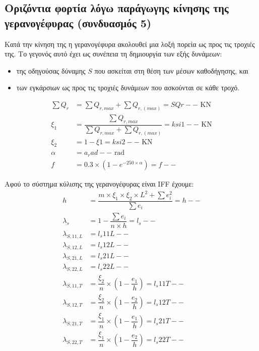 
\subsection{Οριζόντια φορτία λόγω παράγωγης κίνησης της γερανογέφυρας (συνδυασμός 5)}
Κατά την κίνηση της η γερανογέφυρα ακολουθεί μια λοξή πορεία ως προς τις τροχιές της. Το γεγονός αυτό έχει ως συνέπεια τη δημιουργία των εξής δυνάμεων:
\begin{itemize} 
\item της οδηγούσας δύναμης $S$ που ασκείται στη θέση των μέσων καθοδήγησης, και
\item των εγκάρσιων ως προς τις τροχιές δυνάμεων που ασκούνται σε κάθε τροχό.
\end{itemize}

\begin{align*}
\sum{Q_r} &= \displaystyle\sum{Q_{r,max}} + \displaystyle\sum{Q_{r,(max)}} = SQr-- \text{ KN} \\ 
ξ_1    	  &= \dfrac{\displaystyle\sum{Q_{r,max}}}{\displaystyle\sum{Q_{r,max}} + \displaystyle\sum{Q_{r,(max)}}} = ksi1-- \text{ KN} \\ 
ξ_2       &= 1 - ξ1 = ksi2-- \text{ KN} \\ 
α    	  &= a_rad-- \text{ rad} \\ 
f         &= 0.3 \times \left(1 - e^{-250 \times α}\right) = f--
\end{align*}

Αφού το σύστημα κύλισης της γερανογέφυρας είναι IFF έχουμε:
\begin{align*}
h          &= \dfrac{m \times ξ_1 \times ξ_2 \times L^2 + \sum{e_i^2}}{\sum{e_i}} = h-- \\ 
λ_s        &= 1 - \dfrac{\sum{e_i}}{n \times h} =  l_s-- \\ 
λ_{S,11,L} &= l_s11L-- \\ 
λ_{S,12,L} &= l_s12L-- \\ 
λ_{S,21,L} &= l_s21L-- \\ 
λ_{S,22,L} &= l_s22L-- \\ 
λ_{S,11,T} &= \dfrac{ξ_2}{n} \times \left(1 - \dfrac{e_1}{h}\right) = l_s11T-- \\ 
λ_{S,12,T} &= \dfrac{ξ_2}{n} \times \left(1 - \dfrac{e_2}{h}\right) = l_s12T-- \\ 
λ_{S,21,T} &= \dfrac{ξ_1}{n} \times \left(1 - \dfrac{e_1}{h}\right) = l_s21T-- \\ 
λ_{S,22,T} &= \dfrac{ξ_1}{n} \times \left(1 - \dfrac{e_2}{h}\right) = l_s22T--
\end{align*}

